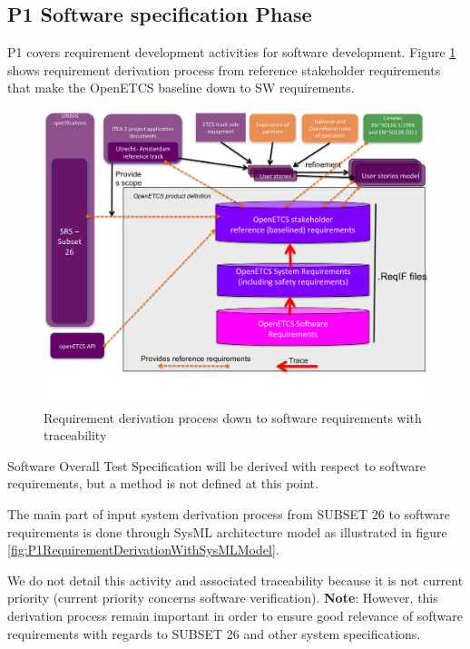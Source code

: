 \documentclass[11pt]{template/openetcs_report}
\begin{document}
\subsection{P1 Software specification Phase}

P1 covers requirement development activities for software development.
Figure \ref{fig:P1RequirementDerivation} shows requirement derivation process from reference stakeholder requirements that make the OpenETCS baseline down to SW requirements.


\begin{figure}[htbp]
\centering
\includegraphics[width=.9\linewidth]
{./images/P1RequirementDerivation.png}
\caption{\label{fig:P1RequirementDerivation}Requirement derivation process down to software requirements with traceability}
\end{figure}

Software Overall Test Specification will be derived with respect to software requirements, but a method is not defined at this point.

The main part of input system derivation process from SUBSET 26 to software requirements is done through SysML architecture model as illustrated in figure \ref{fig:P1RequirementDerivationWithSysMLModel}.
 
We do not detail this activity and associated traceability because it is not current priority (current priority concerns software verification). 
\textbf{Note}: However, this derivation process remain important in order to ensure good relevance of software requirements with regards to SUBSET 26 and other system specifications.
\end{document}
